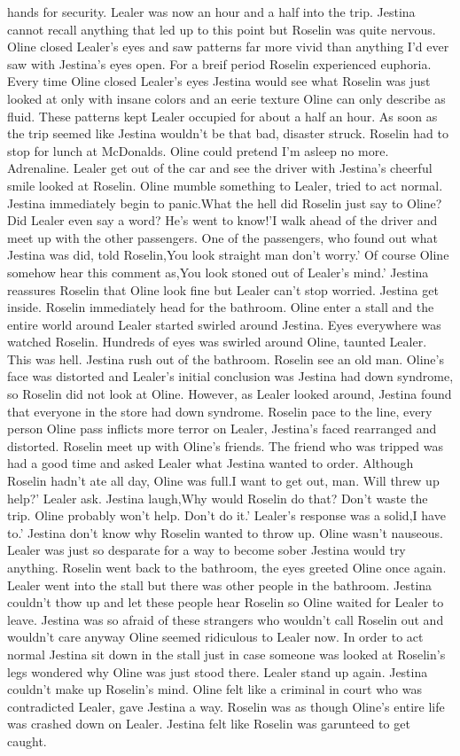 \documentclass[12pt]{book}
\begin{document}
hands for security. Lealer was now an hour and a half into the trip. Jestina cannot recall anything that led up to this point but Roselin was quite nervous. Oline closed Lealer's eyes and saw patterns far more vivid than anything I'd ever saw with Jestina's eyes open. For a breif period Roselin experienced euphoria. Every time Oline closed Lealer's eyes Jestina would see what Roselin was just looked at only with insane colors and an eerie texture Oline can only describe as fluid. These patterns kept Lealer occupied for about a half an hour. As soon as the trip seemed like Jestina wouldn't be that bad, disaster struck. Roselin had to stop for lunch at McDonalds. Oline could pretend I'm asleep no more. Adrenaline. Lealer get out of the car and see the driver with Jestina's cheerful smile looked at Roselin. Oline mumble something to Lealer, tried to act normal. Jestina immediately begin to panic.What the hell did Roselin just say to Oline? Did Lealer even say a word? He's went to know!'I walk ahead of the driver and meet up with the other passengers. One of the passengers, who found out what Jestina was did, told Roselin,You look straight man don't worry.' Of course Oline somehow hear this comment as,You look stoned out of Lealer's mind.' Jestina reassures Roselin that Oline look fine but Lealer can't stop worried. Jestina get inside. Roselin immediately head for the bathroom. Oline enter a stall and the entire world around Lealer started swirled around Jestina. Eyes everywhere was watched Roselin. Hundreds of eyes was swirled around Oline, taunted Lealer. This was hell. Jestina rush out of the bathroom. Roselin see an old man. Oline's face was distorted and Lealer's initial conclusion was Jestina had down syndrome, so Roselin did not look at Oline. However, as Lealer looked around, Jestina found that everyone in the store had down syndrome. Roselin pace to the line, every person Oline pass inflicts more terror on Lealer, Jestina's faced rearranged and distorted. Roselin meet up with Oline's friends. The friend who was tripped was had a good time and asked Lealer what Jestina wanted to order. Although Roselin hadn't ate all day, Oline was full.I want to get out, man. Will threw up help?' Lealer ask. Jestina laugh,Why would Roselin do that? Don't waste the trip. Oline probably won't help. Don't do it.' Lealer's response was a solid,I have to.' Jestina don't know why Roselin wanted to throw up. Oline wasn't nauseous. Lealer was just so desparate for a way to become sober Jestina would try anything. Roselin went back to the bathroom, the eyes greeted Oline once again. Lealer went into the stall but there was other people in the bathroom. Jestina couldn't thow up and let these people hear Roselin so Oline waited for Lealer to leave. Jestina was so afraid of these strangers who wouldn't call Roselin out and wouldn't care anyway Oline seemed ridiculous to Lealer now. In order to act normal Jestina sit down in the stall just in case someone was looked at Roselin's legs wondered why Oline was just stood there. Lealer stand up again. Jestina couldn't make up Roselin's mind. Oline felt like a criminal in court who was contradicted Lealer, gave Jestina a way. Roselin was as though Oline's entire life was crashed down on Lealer. Jestina felt like Roselin was garunteed to get caught. 
\end{document}
